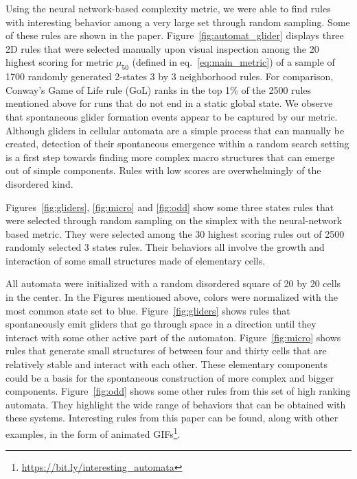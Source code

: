 Using the neural network-based complexity metric, we were able to find rules
with interesting behavior among a very large set through random sampling. Some
of these rules are shown in the paper. Figure~\ref{fig:automat_glider} displays
three 2D rules that were selected manually upon visual inspection among the 20
highest scoring for metric $\mu_{50}$ (defined in eq.~\eqref{eq:main_metric}) of
a sample of 1700 randomly generated 2-states 3 by 3 neighborhood rules. For
comparison, Conway's Game of Life rule (GoL) ranks in the top 1\% of the 2500
rules mentioned above for runs that do not end in a static global state. We
observe that spontaneous glider formation events appear to be captured by our
metric. Although gliders in cellular automata are a simple process that can
manually be created, detection of their spontaneous emergence within a random
search setting is a first step towards finding more complex macro structures
that can emerge out of simple components. Rules with low scores are
overwhelmingly of the disordered kind.

Figures~\ref{fig:gliders}, \ref{fig:micro} and \ref{fig:odd} show some three
states rules that were selected through random sampling on the simplex with the
neural-network based metric. They were selected among the 30 highest scoring
rules out of 2500 randomly selected 3 states rules. Their behaviors all involve
the growth and interaction of some small structures made of elementary cells.

All automata were initialized with a random disordered square of 20 by 20 cells
in the center. In the Figures mentioned above, colors were normalized with the
most common state set to blue. Figure~\ref{fig:gliders} shows rules that
spontaneously emit gliders that go through space in a direction until they
interact with some other active part of the automaton. Figure~\ref{fig:micro}
shows rules that generate small structures of between four and thirty cells that
are relatively stable and interact with each other. These elementary components
could be a basis for the spontaneous construction of more complex and bigger
components. Figure~\ref{fig:odd} shows some other rules from this set of high
ranking automata. They highlight the wide range of behaviors that can be
obtained with these systems. Interesting rules from this paper can be found,
along with other examples, in the form of animated
GIFs\footnote{\url{https://bit.ly/interesting_automata}}.

